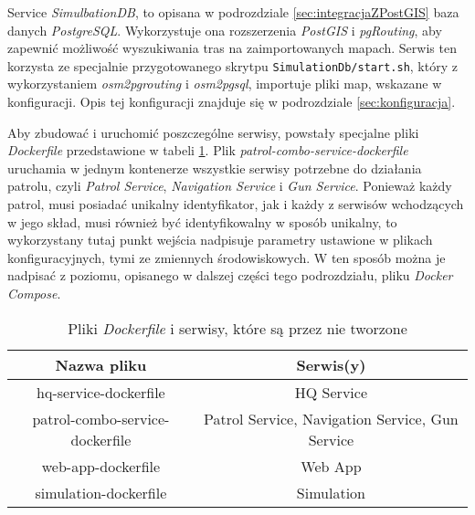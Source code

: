 \par Service \emph{SimulbationDB}, to opisana w podrozdziale \ref{sec:integracjaZPostGIS} baza danych \emph{PostgreSQL}\cite{POSTGRESQL_SITE}. Wykorzystuje ona rozszerzenia \emph{PostGIS}\cite{POSTGIS_SITE} i \emph{pgRouting}\cite{PGROUTING_SITE}, aby zapewnić możliwość wyszukiwania tras na zaimportowanych mapach. Serwis ten korzysta ze specjalnie przygotowanego skrytpu \texttt{SimulationDb/start.sh}, który z wykorzystaniem \emph{osm2pgrouting}\cite{OSM2PGROUTING_GITHUB} i \emph{osm2pgsql}\cite{OSM2PGSQL_GITHUB}, importuje pliki map, wskazane w konfiguracji. Opis tej konfiguracji znajduje się w podrozdziale \ref{sec:konfiguracja}.

\par Aby zbudować i uruchomić poszczególne serwisy, powstały specjalne pliki \emph{Dockerfile} przedstawione w tabeli \ref{tab:dockerDockerFiles}. Plik \emph{patrol-combo-service-dockerfile} uruchamia w jednym kontenerze wszystkie serwisy potrzebne do działania patrolu, czyli \emph{Patrol Service}, \emph{Navigation Service} i \emph{Gun Service}. Ponieważ każdy patrol, musi posiadać unikalny identyfikator, jak i każdy z serwisów wchodzących w jego skład, musi również być identyfikowalny w sposób unikalny, to wykorzystany tutaj punkt wejścia nadpisuje parametry ustawione w plikach konfiguracyjnych, tymi ze zmiennych środowiskowych. W ten sposób można je nadpisać z poziomu, opisanego w dalszej części tego podrozdziału, pliku \emph{Docker Compose}.

\begin{table}
    \centering
    \begin{tabular}{|c|c|} 
     \hline
     Nazwa pliku & Serwis(y) \\
     \hline
     \hline
     hq-service-dockerfile & HQ Service \\ 
     \hline
     patrol-combo-service-dockerfile & Patrol Service, Navigation Service, Gun Service \\ 
     \hline
     web-app-dockerfile & Web App \\ 
     \hline
     simulation-dockerfile & Simulation \\ 
     \hline
    \end{tabular}
    \caption{Pliki \emph{Dockerfile} i serwisy, które są przez nie tworzone}
    \label{tab:dockerDockerFiles}
\end{table}

